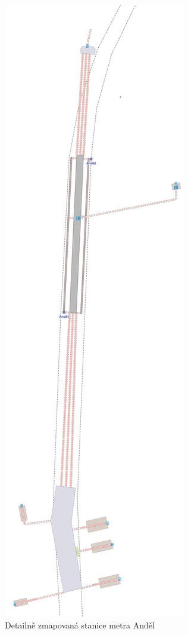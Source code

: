 \begin{figure}
  \centering
    \includegraphics[height=0.98\textheight]{../img/andel.pdf}
  \caption{Detailně zmapovaná stanice metra Anděl}
  \label{fig:metro-detail}
\end{figure}

